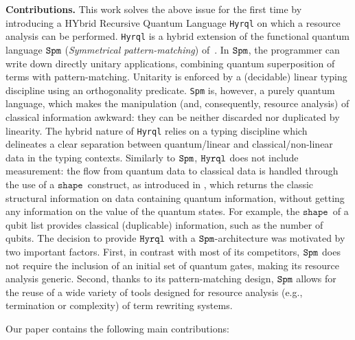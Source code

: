 \documentclass[10pt,a4paper]{article}
\newcommand{\textshape}{\ensuremath{\mathtt{shape}}}
\newcommand{\hyrql}{{{\tt{Hyrql}}}}
\newcommand{\spm}{{{\tt{Spm}}}}
\begin{document}
\medskip
\noindent
\textbf{Contributions. }
This work solves the above issue for the first time by introducing a HYbrid
Recursive Quantum Language \hyrql{} on which a resource analysis can be
performed. \hyrql{} is a hybrid extension of the functional quantum language
$\spm$ (\emph{Symmetrical pattern-matching}) of~\cite{SVV18,Lem24}. In $\spm$,
the programmer can write down directly unitary applications, combining quantum
superposition of terms with pattern-matching. Unitarity is enforced by a
(decidable) linear typing discipline using an orthogonality predicate. \spm{}
is, however, a purely quantum language, which makes the manipulation (and,
consequently, resource analysis) of classical information awkward: they can be
neither discarded nor duplicated by linearity. The hybrid nature of \hyrql{}
relies on a typing discipline which delineates a clear separation between
quantum/linear and classical/non-linear data in the typing contexts. Similarly
to $\spm$, $\hyrql$ does not include measurement: the flow from quantum data to
classical data is handled through the use of a \textshape\ construct,  as
introduced in \cite{GLRSV13}, which returns the classic structural information
on data containing quantum information, without getting any information on the
value of the quantum states. For example, the  \textshape\ of a qubit list
provides classical (duplicable) information, such as the number of qubits. The
decision to provide $\hyrql$ with a $\spm$-architecture was motivated by two
important factors. First, in contrast with most of its competitors, $\spm$ does
not require the inclusion of an initial set of quantum gates, making its
resource analysis generic. Second, thanks to its pattern-matching design, $\spm
$ allows for the reuse of a wide variety of tools designed for resource
analysis (e.g., termination or complexity) of term rewriting systems.

Our paper contains the following main contributions:
\end{document}
